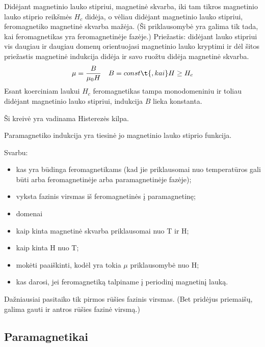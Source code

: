 Didėjant magnetinio lauko stipriui, magnetinė skvarba, iki tam tikros
magnetinio lauko stiprio reikšmės $H_{c}$ didėja, o vėliau didėjant
magnetinio lauko stipriui, feromagnetiko magnetinė skvarba mažėja.
(Ši priklausomybė yra galima tik tada, kai feromagnetikas yra 
feromagnetinėje fazėje.)
Priežastis: didėjant lauko stipriui vis daugiau ir daugiau domenų
orientuojasi magnetinio lauko kryptimi ir dėl šitos priežastis
magnetinė indukcija didėja ir savo ruožtu didėja magnetinė
skvarba.
\begin{align*}
  \mu &= \frac{B}{\mu_{0}H} & B = const\t{, kai} H \geq H_{c} \\
\end{align*}
Esant koerciniam laukui $H_{c}$ feromagnetikas tampa monodomeniniu ir
toliau didėjant magnetinio lauko stipriui, indukcija $B$ lieka konstanta.


Ši kreivė yra vadinama Histerezės kilpa.

Paramagnetiko indukcija yra tiesinė jo magnetinio lauko stiprio
funkcija.

Svarbu:
\begin{itemize}
  \item kas yra būdinga feromagnetikams (kad jie priklausomai nuo
    temperatūros gali būti arba feromagnetinėje arba paramagnetinėje
    fazėje);
  \item vyksta fazinis virsmas iš feromagnetinės į paramagnetinę;
  \item domenai
  \item kaip kinta magnetinė skvarba priklausomai nuo T ir H;
  \item kaip kinta H nuo T;
  \item mokėti paaiškinti, kodėl yra tokia $\mu$ priklausomybė nuo H;
  \item kas darosi, jei feromagnetiką talpiname į periodinį magnetinį
    lauką.
\end{itemize}
Dažniausiai pasitaiko tik pirmos rūšies fazinis virsmas. (Bet pridėjus
priemaišų, galima gauti ir antros rūšies fazinė virsmą.)

\subsection{Paramagnetikai}

